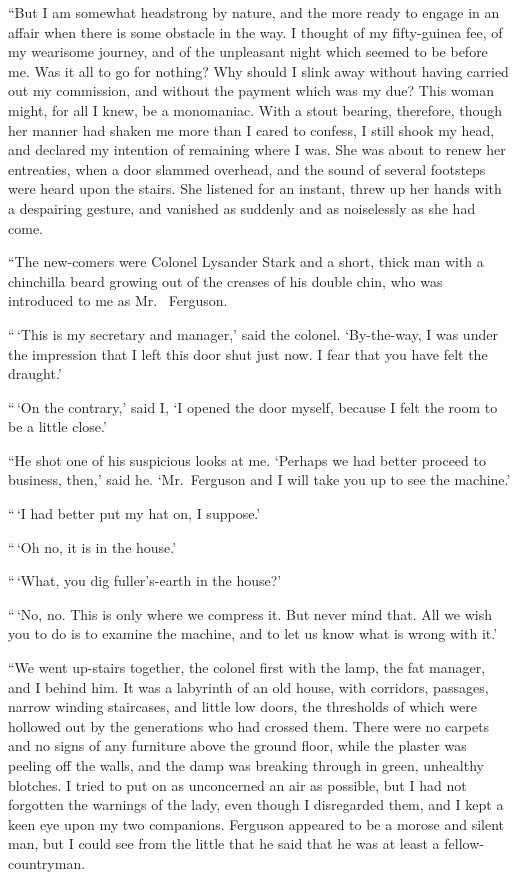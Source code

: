 “But I am somewhat headstrong by nature, and the more
ready to engage in an affair when there is some obstacle in
the way. I thought of my fifty-guinea fee, of my wearisome
journey, and of the unpleasant night which seemed to be before
me. Was it all to go for nothing? Why should I slink
away without having carried out my commission, and without
the payment which was my due? This woman might, for all
I knew, be a monomaniac. With a stout bearing, therefore,
though her manner had shaken me more than I cared to confess,
I still shook my head, and declared my intention of remaining
where I was. She was about to renew her entreaties,
when a door slammed overhead, and the sound of several
footsteps were heard upon the stairs. She listened for an instant,
threw up her hands with a despairing gesture, and vanished
as suddenly and as noiselessly as she had come.

“The new-comers were Colonel Lysander Stark and a short,
thick man with a chinchilla beard growing out of the creases
of his double chin, who was introduced to me as Mr.\ %
Ferguson.

“\,‘This is my secretary and manager,’ said the colonel.
‘By-the-way, I was under the impression that I left this door
shut just now. I fear that you have felt the draught.’

“\,‘On the contrary,’ said I, ‘I opened the door myself, because
I felt the room to be a little close.’

“He shot one of his suspicious looks at me. ‘Perhaps we
had better proceed to business, then,’ said he. ‘Mr.~Ferguson
and I will take you up to see the machine.’

“\,‘I had better put my hat on, I suppose.’

“\,‘Oh no, it is in the house.’

“\,‘What, you dig fuller’s-earth in the house?’

“\,‘No, no. This is only where we compress it. But never
mind that. All we wish you to do is to examine the
machine, and to let us know what is wrong with it.’

“We went up-stairs together, the colonel first with the
lamp, the fat manager, and I behind him. It was a labyrinth
of an old house, with corridors, passages, narrow winding
staircases, and little low doors, the thresholds of which were
hollowed out by the generations who had crossed them.
There were no carpets and no signs of any furniture above
the ground floor, while the plaster was peeling off the walls,
and the damp was breaking through in green, unhealthy
blotches. I tried to put on as unconcerned an air as possible,
but I had not forgotten the warnings of the lady, even
though I disregarded them, and I kept a keen eye upon my
two companions. Ferguson appeared to be a morose and
silent man, but I could see from the little that he said that
he was at least a fellow-countryman.

